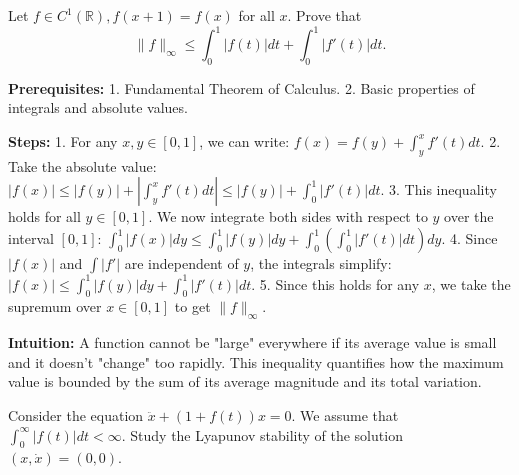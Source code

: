 \begin{exercise}
\label{analysis:2010:8}
Let $f \in C^1(\mathbb{R}), f(x+1) = f(x)$ for all $x$. Prove that
\[
\|f\|_{\infty} \leq \int_0^1 |f(t)| dt + \int_0^1 |f'(t)| dt.
\]
\end{exercise}

\begin{solution}
\textbf{Prerequisites:}
1. Fundamental Theorem of Calculus.
2. Basic properties of integrals and absolute values.

\textbf{Steps:}
1. For any $x, y \in [0, 1]$, we can write: $f(x) = f(y) + \int_y^x f'(t) dt$.
2. Take the absolute value: $|f(x)| \leq |f(y)| + |\int_y^x f'(t) dt| \leq |f(y)| + \int_0^1 |f'(t)| dt$.
3. This inequality holds for all $y \in [0, 1]$. We now integrate both sides with respect to $y$ over the interval $[0, 1]$:
$\int_0^1 |f(x)| dy \leq \int_0^1 |f(y)| dy + \int_0^1 \left( \int_0^1 |f'(t)| dt \right) dy$.
4. Since $|f(x)|$ and $\int |f'|$ are independent of $y$, the integrals simplify:
$|f(x)| \leq \int_0^1 |f(y)| dy + \int_0^1 |f'(t)| dt$.
5. Since this holds for any $x$, we take the supremum over $x \in [0, 1]$ to get $\|f\|_\infty$.

\textbf{Intuition:}
A function cannot be "large" everywhere if its average value is small and it doesn't "change" too rapidly. This inequality quantifies how the maximum value is bounded by the sum of its average magnitude and its total variation.
\end{solution}

\begin{exercise}
\label{analysis:2010:9}
Consider the equation $\ddot{x} + (1 + f(t)) x = 0$. We assume that $\int_0^\infty |f(t)| dt < \infty$. Study the Lyapunov stability of the solution $(x, \dot{x}) = (0, 0)$.
\end{exercise}

